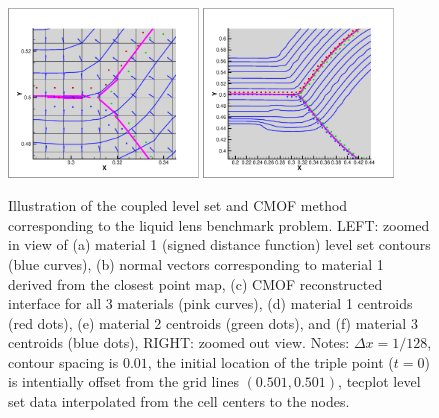 \documentclass[]{article}
\begin{document}
\begin{figure}[htbp]
  \centering
    \includegraphics[width=0.45\textwidth]{zoomed_in.eps}
    \includegraphics[width=0.45\textwidth]{zoomed_out.eps}
        \caption{Illustration of the coupled level set and 
	CMOF method corresponding to the liquid lens benchmark problem.
	LEFT: zoomed in view of (a) material 1 (signed distance function)
	level set contours (blue 
	curves), (b) normal vectors corresponding to material 1 derived 
	from the closest point map, 
	(c) CMOF reconstructed interface for all 3 materials 
	(pink curves), (d) material 1 centroids (red dots),
	(e) material 2 centroids (green dots), and
	(f) material 3 centroids (blue dots),
	RIGHT: zoomed out view.  Notes: $\Delta x=1/128$, contour
	spacing is $0.01$, the initial location of the triple point ($t=0$)
	is intentially offset from the grid lines $(0.501,0.501)$,
	tecplot level set data interpolated from the cell
	centers to the nodes.
    }
  \label{distancefunction}
\end{figure}
\end{document}
